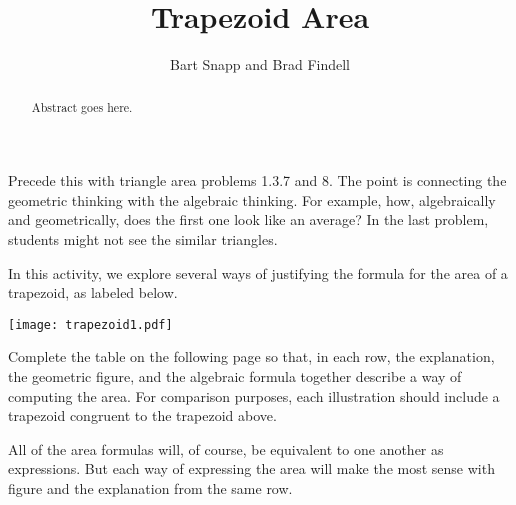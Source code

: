 \documentclass{ximera}
\title{Trapezoid Area}
\author{Bart Snapp and Brad Findell}
\begin{document}
\begin{abstract}
Abstract goes here.  
\end{abstract}
\maketitle


\begin{teachingnote}
Precede this with triangle area problems 1.3.7 and 8.  The point is connecting the geometric thinking with the algebraic thinking.  For example, how, algebraically and geometrically, does the first one look like an average?  In the last problem, students might not see the similar triangles.
\end{teachingnote}

\begin{problem}
In this activity, we explore several ways of justifying the formula for the area of a trapezoid, as labeled below. 
\begin{image}
\texttt{[image: trapezoid1.pdf]}
\end{image}
Complete the table on the following page so that, in each row, the explanation, the geometric figure, and the algebraic formula together describe a way of computing the area.  For comparison purposes, each illustration should include a trapezoid congruent to the trapezoid above.   

All of the area formulas will, of course, be equivalent to one another as expressions.  But each way of expressing the area will make the most sense with figure and the explanation from the same row.  


\newpage

\newlength{\formulawidth}

\end{problem}
\end{document}
